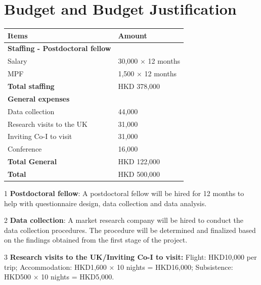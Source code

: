 \documentclass[11pt,a4paper]{amsart}
\theoremstyle{plain}
\theoremstyle{definition}
\begin{document}
\section{Budget and Budget Justification}
\begin{singlespace}
	\begin{table}[H] 
	\begin{center}
		\begin{threeparttable}
				\begin{NiceTabular*}{\linewidth}{@{\extracolsep{\fill}}ll}
				\toprule
				Items & Amount\\
				\midrule
				\textbf{Staffing - Postdoctoral fellow } & \\
				\phantom{ZZ} Salary  & 30,000 $\times$ 12 months\\
				\phantom{ZZ} MPF & 1,500 $\times$ 12 months\\
				\textbf{Total staffing} & HKD 378,000 \\
				\textbf{General expenses} & \\
				\phantom{ZZ} Data collection  & 44,000 \\
				\phantom{ZZ} Research visits to the UK  & 31,000 \\
				\phantom{ZZ} Inviting Co-I to visit  & 31,000 \\
				\phantom{ZZ} Conference & 16,000 \\
				\textbf{Total General} & HKD 122,000 \\
				\textbf{Total} & HKD 500,000 \\
				\bottomrule
			\end{NiceTabular*}
\begin{tablenotes}
\item[1] \footnotesize \textbf{Postdoctoral fellow}: A postdoctoral fellow will be hired for 12 months to help with questionnaire design, data collection and data analysis. 
\vspace{2pt}
\item[2]\footnotesize  \textbf{Data collection}: A market research company will be hired to conduct the data collection procedures. The procedure will be determined and finalized based on the findings obtained from the first stage of the project.
\vspace{2pt}
\item[3] \footnotesize
	 \textbf{Research visits to the UK/Inviting Co-I to visit:} Flight: HKD10,000 per trip;  Accommodation: HKD1,600 × 10 nights = HKD16,000; Subsistence: HKD500 × 10 nights = HKD5,000.
\end{tablenotes}
\end{threeparttable}

	\end{center}
\end{table}
\end{singlespace}
\end{document}
